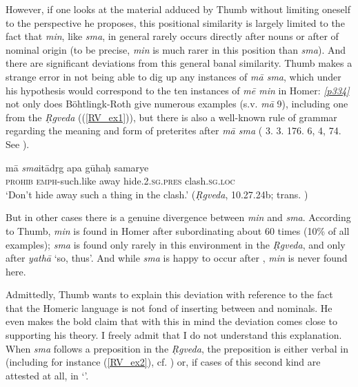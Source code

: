However, if one looks at the material adduced by Thumb without limiting oneself to the perspective he proposes, this positional similarity is largely limited to the fact that \emph{min}, like \emph{sma}, in general rarely occurs directly after nouns or after  of nominal origin (to be precise, \emph{min} is much rarer in this position than \emph{sma}). And there are significant deviations from this general banal similarity. Thumb makes a strange error in not being able to dig up any instances of  \emph{mā sma}, which under his hypothesis would correspond to the ten instances of \emph{mē min} in Homer: \hyperlink{p334}{\emph{[p334]}} not only does Böhtlingk-Roth \citeyearpar{BoehtlingkRoth1855} give numerous examples (s.v. \emph{mā} 9), including one from the \textit{\d{R}gveda} ((\ref{RV_ex1})), but there is also a well-known rule of  grammar regarding the meaning and form of preterites after \emph{mā sma} ( 3. 3. 176. 6, 4, 74. See \citealp[361, §808 note 4]{Benfey1852}).

\begin{exe}
\ex \gll mā \emph{sma}itādṛg apa gūhaḥ samarye \\
\textsc{prohib} \textsc{emph}-such.like away hide.\textsc{2.sg.pres} clash.\textsc{sg.loc} \\
\trans `Don’t hide away such a thing in the clash.'
(\textit{\d{R}gveda}, 10.27.24b; trans. \citealt[1417]{JamisonBrereton2014})
\label{RV_ex1}
\end{exe}

But in other cases there is a genuine divergence between \emph{min} and \emph{sma}. According to Thumb, \emph{min} is found in Homer after subordinating  about 60 times (10\% of all examples); \emph{sma} is found only rarely in this environment in the \textit{\d{R}gveda}, and only after \emph{yathā} `so, thus'. And while \emph{sma} is happy to occur after , \emph{min} is never found here.

Admittedly, Thumb wants to explain this deviation with reference to the fact that the Homeric language is not fond of inserting  between  and nominals. He even makes the bold claim that with this in mind the deviation comes close to supporting his theory. I freely admit that I do not understand this explanation. When \emph{sma} follows a preposition in the \textit{\d{R}gveda}, the preposition is either verbal in  (including for instance (\ref{RV_ex2}), cf. \citet[1598]{Grassmann1873}) or, if cases of this second kind are attested at all, in `'.

